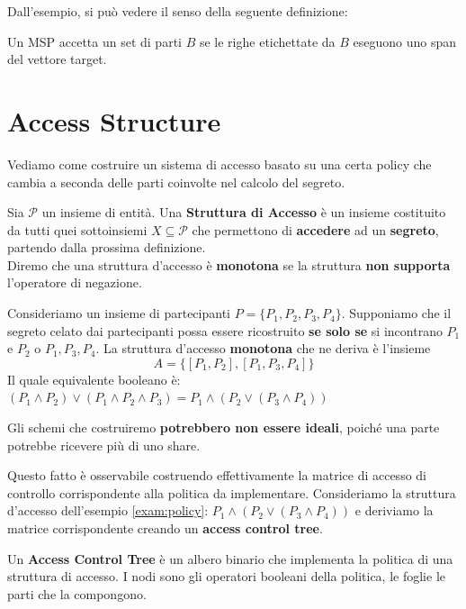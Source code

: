 Dall'esempio, si può vedere il senso della seguente definizione:
\begin{definition}\label{def:mspacc}
Un MSP accetta un set di parti $B$ se le righe etichettate da $B$ eseguono uno span del vettore target.
\end{definition}
\section{Access Structure}
Vediamo come costruire un sistema di accesso basato su una certa policy che cambia a seconda delle parti coinvolte nel calcolo del segreto.\pagebreak
\begin{definition}
Sia $\mathcal{P}$ un insieme di entità. Una \textbf{Struttura di Accesso} è un insieme costituito da tutti quei sottoinsiemi $X\subseteq\mathcal{P}$ che permettono di \textbf{accedere} ad un \textbf{segreto}, partendo dalla prossima definizione.\\
Diremo che una struttura d'accesso è \textbf{monotona} se la struttura \textbf{non supporta} l'operatore di negazione.
\end{definition}
\begin{example}\label{exam:policy}Consideriamo un insieme di partecipanti $P=\{P_1,P_2,P_3,P_4\}$. Supponiamo che il segreto celato dai partecipanti possa essere ricostruito \textbf{se solo se} si incontrano $P_1$ e $P_2$ o $P_1,P_3,P_4$. La struttura d'accesso \textbf{monotona} che ne deriva è l'insieme
\[A=\{[P_1,P_2],[P_1,P_3,P_4]\}\]
Il quale equivalente booleano è: $(P_1\land P_2)\lor (P_1\land P_2\land P_3)=P_1\land(P_2\lor (P_3\land P_4))$
\end{example}
\begin{remark}
Gli schemi che costruiremo \textbf{potrebbero non essere ideali}, poiché una parte potrebbe ricevere più di uno share.
\end{remark}
Questo fatto è osservabile costruendo effettivamente la matrice di accesso di controllo corrispondente alla politica da implementare.
Consideriamo la struttura d'accesso dell'esempio \ref{exam:policy}: $P_1\land(P_2\lor (P_3\land P_4))$ e deriviamo la matrice corrispondente creando un \textbf{access control tree}.
\begin{definition}\label{def:act}
Un \textbf{Access Control Tree} è un albero binario che implementa la politica di una struttura di accesso. I nodi sono gli operatori booleani della politica, le foglie le parti che la compongono. 
\end{definition}
